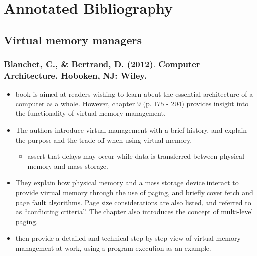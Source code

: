 \section{Annotated Bibliography}

\subsection{Virtual memory managers}

\subsubsection*{Blanchet, G., \& Bertrand, D. (2012). Computer Architecture. Hoboken, NJ: Wiley.}

\begin{itemize}
\item {} book is aimed at readers wishing to learn about the essential architecture of a computer as a whole. However, chapter 9 (p. 175 - 204) provides insight into the functionality of virtual memory management.
\item The authors introduce virtual management with a brief history, and explain the purpose and the trade-off when using virtual memory.
	\begin{itemize}
	\item \citet{Blanchet2012} assert that delays may occur while data is transferred between physical memory and mass storage.
	\end{itemize}
\item They explain how physical memory and a mass storage device interact to provide virtual memory through the use of paging, and briefly cover fetch and page fault algorithms. Page size considerations are also listed, and referred to as ``conflicting criteria''. The chapter also introduces the concept of multi-level paging.
\item \citet{Blanchet2012} then provide a detailed and technical step-by-step view of virtual memory management at work, using a program execution as an example.
\end{itemize}